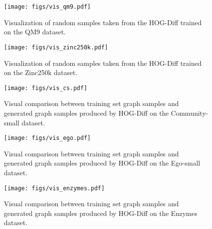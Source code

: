 \begin{figure}[!ht]
    \centering
    \texttt{[image: figs/vis\_qm9.pdf]}
    \caption{Visualization of random samples taken from the HOG-Diff trained on the QM9 dataset. }
    \label{fig:qm9}
\end{figure}

\begin{figure}
    \centering
    \texttt{[image: figs/vis\_zinc250k.pdf]}
    \caption{Visualization of random samples taken from the HOG-Diff trained on the Zinc250k dataset. }
    \label{fig:zinc250k}
\end{figure}

\begin{figure}
    \centering
    \texttt{[image: figs/vis\_cs.pdf]}
    \caption{Visual comparison between training set graph samples and generated graph samples produced by HOG-Diff on the Community-small dataset.}
\end{figure}

\begin{figure}
    \centering
    \texttt{[image: figs/vis\_ego.pdf]}
    \caption{Visual comparison between training set graph samples and generated graph samples produced by HOG-Diff on the Ego-small dataset.}
\end{figure}

\begin{figure}
    \centering
    \texttt{[image: figs/vis\_enzymes.pdf]}
    \caption{Visual comparison between training set graph samples and generated graph samples produced by HOG-Diff on the Enzymes dataset.}
    \label{fig:enzymes}
\end{figure}
